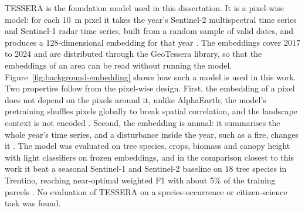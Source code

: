 TESSERA is the foundation model used in this dissertation. It is a
pixel-wise model: for each 10~m pixel it takes the year's Sentinel-2
multispectral time series and Sentinel-1 radar time series, built from
a random sample of valid dates, and produces a 128-dimensional
embedding for that year \cite{feng2025}. The embeddings cover 2017 to
2024 and are distributed through the GeoTessera library, so that the
embeddings of an area can be read without running the model.
Figure~\ref{fig:background-embedding} shows how such a model is used
in this work.
Two
properties follow from the pixel-wise design. First, the embedding of
a pixel does not depend on the pixels around it, unlike AlphaEarth;
the model's pretraining shuffles pixels globally to break spatial
correlation, and the landscape context is not encoded
\cite{feng2025,stewart2026}. Second, the embedding is annual: it
summarises the whole year's time series, and a disturbance inside the
year, such as a fire, changes it \cite{silva2026}. The model was
evaluated on tree species, crops, biomass and canopy height with light
classifiers on frozen embeddings, and in the comparison closest to
this work it beat a seasonal Sentinel-1 and Sentinel-2 baseline on 18
tree species in Trentino, reaching near-optimal weighted F1 with about
5\% of the training parcels \cite{ball2026}. No evaluation of TESSERA
on a species-occurrence or citizen-science task was found.

